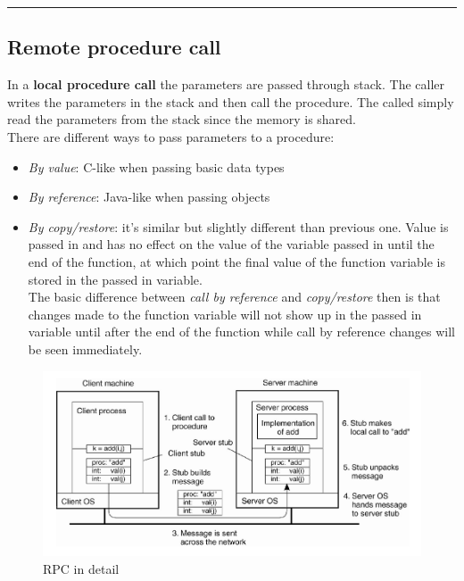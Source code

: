 \begin{center}\rule{3in}{0.4pt}\end{center}

\subsection{Remote procedure call}
In a \textbf{local procedure call} the parameters are passed through stack. The caller writes the parameters in the stack and then call the procedure. The called simply read the parameters from the stack since the memory is shared.\\
There are different ways to pass parameters to a procedure:
\begin{itemize}
    \item \textit{By value}: C-like when passing basic data types
    \item \textit{By reference}: Java-like when passing objects
    \item \textit{By copy/restore}: it's similar but slightly different than previous one. Value is passed in and has no effect on the value of the variable passed in until the end of the function, at which point the final value of the function variable is stored in the passed in variable.\\
    The basic difference between \textit{call by reference} and \textit{copy/restore} then is that changes made to the function variable will not show up in the passed in variable until after the end of the function while call by reference changes will be seen immediately.
\end{itemize}

\begin{figure}[h]
\caption{RPC in detail}
\includegraphics[width=\textwidth]{src/images/communication/rpc-in-detail.png}
\centering
\end{figure}

